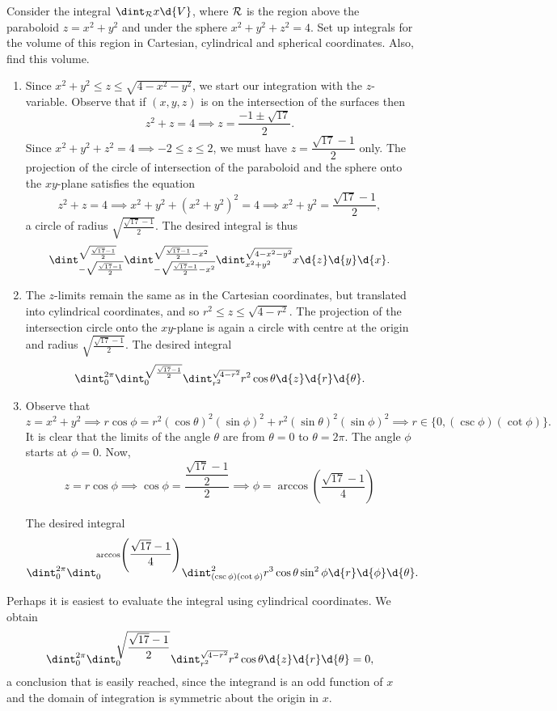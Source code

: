 \begin{pro}
Consider the integral $\dint _{{\cal R}} x \d{V}$, where ${\cal R}$
is the region above the paraboloid $z=x^2+y^2$ and under the sphere
$x^2+y^2+z^2 =4$. Set up integrals for the volume of this region in
Cartesian, cylindrical and spherical coordinates. Also, find this
volume.
\begin{answer}
\noindent
\begin{enumerate}
\item Since $x^2+y^2\leq z\leq \sqrt{4-x^2-y^2}$, we start our
integration with the $z$-variable. Observe that if $(x,y,z)$ is on
the intersection of the surfaces then  $$ z^2+z=4 \implies
z=\dfrac{-1\pm \sqrt{17}}{2}.
$$Since $x^2+y^2+z^2 =4 \implies -2 \leq z \leq 2$, we must have
$z=\dfrac{\sqrt{17}-1}{2}$ only. The projection of the circle of
intersection of the paraboloid and the sphere onto the $xy$-plane
satisfies the equation
$$z^2+z=4 \implies x^2+y^2+(x^2+y^2)^2=4 \implies x^2+y^2=\dfrac{\sqrt{17}-1}{2},  $$a circle of radius
$\sqrt{\frac{\sqrt{17}-1}{2}}$. The desired integral is thus
$$\dint _{-\sqrt{\frac{\sqrt{17}-1}{2}}} ^{\sqrt{\frac{\sqrt{17}-1}{2}}} \dint _{-\sqrt{\frac{\sqrt{17}-1}{2}-x^2}}  ^{\sqrt{\frac{\sqrt{17}-1}{2}-x^2}} \dint _{x^2+y^2} ^{\sqrt{4-x^2-y^2}} x\d{z}\d{y}\d{x}.  $$
\item  The $z$-limits remain the same as in the Cartesian coordinates, but translated into cylindrical coordinates, and so
$r^2\leq z\leq \sqrt{4-r^2}$. The projection of the intersection
circle onto the $xy$-plane is again a circle with centre at the
origin and radius $\sqrt{\frac{\sqrt{17}-1}{2}}$. The desired
integral
$$\dint _{0} ^{2\pi} \dint _{0}  ^{\sqrt{\frac{\sqrt{17}-1}{2}}} \dint _{r^2} ^{\sqrt{4-r^2}} r^2\cos \theta \d{z}\d{r}\d{\theta}.  $$


\item  Observe that $$ z=x^2+y^2 \implies r\cos \phi=r^2(\cos \theta)^2(\sin\phi)^2+r^2(\sin\theta)^2(\sin\phi)^2 \implies
r \in \{0, (\csc \phi)(\cot \phi)\}. $$It is clear that the limits
of the angle $\theta$ are from $\theta =0$ to $\theta =2\pi$. The
angle $\phi$ starts at $\phi=0$.   Now,
$$z=r\cos\phi \implies \cos \phi = \dfrac{\dfrac{\sqrt{17}-1}{2}}{2} \implies \phi = \arccos \left(\dfrac{\sqrt{17}-1}{4}\right)$$

The desired integral
$$\dint _{0} ^{2\pi} \dint _{0}  ^{\arccos \left(\dfrac{\sqrt{17}-1}{4}\right)} \dint _{(\csc \phi)(\cot \phi)} ^{2} r^3\cos \theta\sin ^2 \phi \d{r}\d{\phi}\d{\theta}.  $$

\end{enumerate}


Perhaps it is easiest to evaluate the integral using cylindrical
coordinates. We obtain
$$\dint _{0} ^{2\pi} \dint _{0}  ^{\sqrt{\dfrac{\sqrt{17}-1}{2}}} \dint _{r^2} ^{\sqrt{4-r^2}} r^2\cos \theta \d{z}\d{r}\d{\theta} = 0,  $$
a conclusion that is easily reached, since the integrand is an odd
function of $x$ and the domain of integration is symmetric about the
origin in $x$.
\end{answer}

\end{pro}
